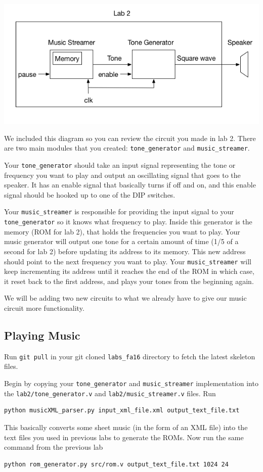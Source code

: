 \documentclass[11pt]{article}
\begin{document}
\includegraphics[width=\textwidth]{images/lab2_fig1.png}

We included this diagram so you can review the circuit you made in lab 2. There are two main modules that you created: \verb|tone_generator| and \verb|music_streamer|. 

Your \verb|tone_generator| should take an input signal representing the tone or frequency you want to play and output an oscillating signal that goes to the speaker. It has an enable signal that basically turns if off and on, and this enable signal should be hooked up to one of the DIP switches.  

Your \verb|music_streamer| is responsible for providing the input signal to your \verb|tone_generator| so it knows what frequency to play. Inside this generator is the memory (ROM for lab 2), that holds the frequencies you want to play. Your music generator will output one tone for a certain amount of time (1/5 of a second for lab 2) before updating its address to its memory. This new address should point to the next frequency you want to play. Your \verb|music_streamer| will keep incrementing its address until it reaches the end of the ROM in which case, it reset back to the first address, and plays your tones from the beginning again. 

We will be adding two new circuits to what we already have to give our music circuit more functionality.

\subsection{Playing Music}
Run \verb|git pull| in your git cloned \verb|labs_fa16| directory to fetch the latest skeleton files.

Begin by copying your \verb|tone_generator| and \verb|music_streamer| implementation into the \newline \verb|lab2/tone_generator.v| and \verb|lab2/music_streamer.v| files. Run 
\begin{verbatim}
python musicXML_parser.py input_xml_file.xml output_text_file.txt
\end{verbatim}
This basically converts some sheet music (in the form of an XML file) into the text files you used in previous labs to generate the ROMs. Now run the same command from the previous lab
\begin{verbatim}
python rom_generator.py src/rom.v output_text_file.txt 1024 24
\end{verbatim}
\end{document}
